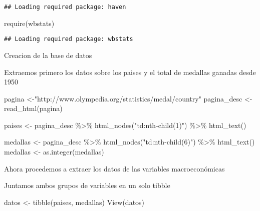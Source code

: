 \documentclass[
]{article}
\newenvironment{Shaded}{\begin{snugshade}}{\end{snugshade}}
\newcommand{\FunctionTok}[1]{\textcolor[rgb]{0.00,0.00,0.00}{#1}}
\newcommand{\NormalTok}[1]{#1}
\newcommand{\OtherTok}[1]{\textcolor[rgb]{0.56,0.35,0.01}{#1}}
\newcommand{\SpecialCharTok}[1]{\textcolor[rgb]{0.00,0.00,0.00}{#1}}
\newcommand{\StringTok}[1]{\textcolor[rgb]{0.31,0.60,0.02}{#1}}
\begin{document}
\begin{verbatim}
## Loading required package: haven
\end{verbatim}

\begin{Shaded}
\begin{Highlighting}[]
\FunctionTok{require}\NormalTok{(wbstats)}
\end{Highlighting}
\end{Shaded}

\begin{verbatim}
## Loading required package: wbstats
\end{verbatim}

Creacion de la base de datos

Extraemos primero los datos sobre los paises y el total de medallas
ganadas desde 1950

\begin{Shaded}
\begin{Highlighting}[]
\NormalTok{pagina }\OtherTok{\textless{}{-}}\StringTok{"http://www.olympedia.org/statistics/medal/country"}
\NormalTok{pagina\_desc }\OtherTok{\textless{}{-}} \FunctionTok{read\_html}\NormalTok{(pagina)}

\NormalTok{paises }\OtherTok{\textless{}{-}}\NormalTok{ pagina\_desc }\SpecialCharTok{\%\textgreater{}\%} \FunctionTok{html\_nodes}\NormalTok{(}\StringTok{"td:nth{-}child(1)"}\NormalTok{) }\SpecialCharTok{\%\textgreater{}\%} \FunctionTok{html\_text}\NormalTok{() }

\NormalTok{medallas }\OtherTok{\textless{}{-}}\NormalTok{ pagina\_desc }\SpecialCharTok{\%\textgreater{}\%} \FunctionTok{html\_nodes}\NormalTok{(}\StringTok{"td:nth{-}child(6)"}\NormalTok{) }\SpecialCharTok{\%\textgreater{}\%} \FunctionTok{html\_text}\NormalTok{()}
\NormalTok{medallas }\OtherTok{\textless{}{-}} \FunctionTok{as.integer}\NormalTok{(medallas)}
\end{Highlighting}
\end{Shaded}

Ahora procedemos a extraer los datos de las variables macroeconómicas

Juntamos ambos grupos de variables en un solo tibble

\begin{Shaded}
\begin{Highlighting}[]
\NormalTok{datos }\OtherTok{\textless{}{-}} \FunctionTok{tibble}\NormalTok{(paises, medallas)}
\FunctionTok{View}\NormalTok{(datos)}
\end{Highlighting}
\end{Shaded}
\end{document}
